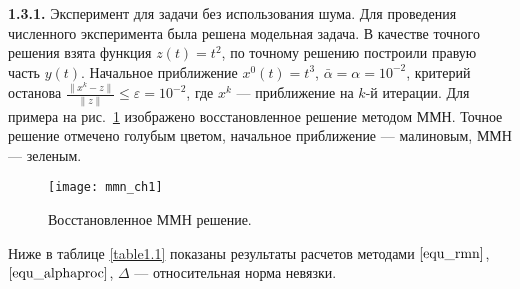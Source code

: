 {\bfseries 1.3.1.} Эксперимент для задачи без использования шума. Для проведения численного эксперимента была решена модельная задача. В качестве точного решения взята функция $z(t)=t^2$, по точному решению построили правую часть $y(t)$.  Начальное приближение $x^0(t)=t^3$, $\bar\alpha=\alpha=10^{-2}$, критерий останова $\frac{\|x^k-z\|}{\|z\|}\le\varepsilon=10^{-2}$, где $x^k$ --- приближение на $k$-й итерации. Для примера на рис.~\ref{fig:mmn_ch1} изображено восстановленное решение методом ММН. Точное решение отмечено голубым цветом, начальное приближение --- малиновым, ММН --- зеленым. 
\begin{figure}
	\centering
	\texttt{[image: mmn\_ch1]}
	\caption{Восстановленное ММН решение.}
	\label{fig:mmn_ch1}
\end{figure}
Ниже в таблице \ref{table1.1} показаны результаты расчетов методами $\eqref{equ_rmn}$, $\eqref{equ_alphaproc}$, $\Delta$ --- относительная норма невязки. 
